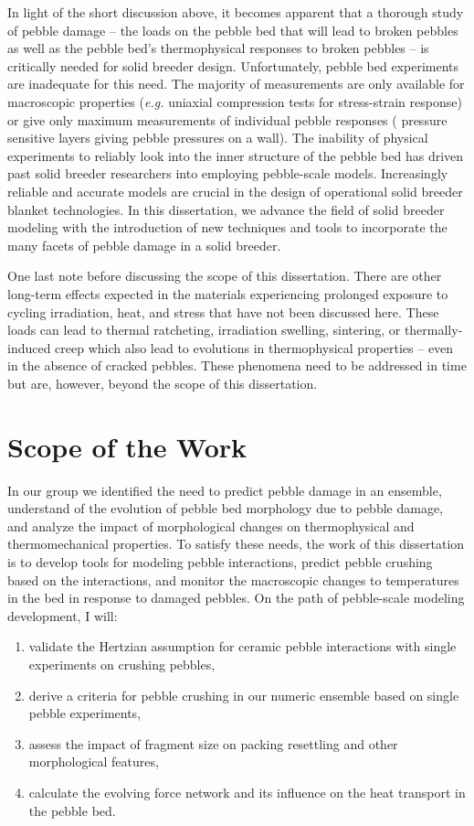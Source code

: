 In light of the short discussion above, it becomes apparent that a thorough study of pebble damage -- the loads on the pebble bed that will lead to broken pebbles as well as the pebble bed's thermophysical responses to broken pebbles -- is critically needed for solid breeder design. Unfortunately, pebble bed experiments are inadequate for this need. The majority of measurements are only available for macroscopic properties (\textit{e.g.} uniaxial compression tests for stress-strain response) or give only maximum measurements of individual pebble responses ( pressure sensitive layers giving pebble pressures on a wall). The inability of physical experiments to reliably look into the inner structure of the pebble bed has driven past solid breeder researchers into employing pebble-scale models. Increasingly reliable and accurate models are crucial in the design of operational solid breeder blanket technologies. In this dissertation, we advance the field of solid breeder modeling with the introduction of new techniques and tools to incorporate the many facets of pebble damage in a solid breeder.

One last note before discussing the scope of this dissertation. There are other long-term effects expected in the materials experiencing prolonged exposure to cycling irradiation, heat, and stress that have not been discussed here. These loads can lead to thermal ratcheting, irradiation swelling, sintering, or thermally-induced creep which also lead to evolutions in thermophysical properties -- even in the absence of cracked pebbles. These phenomena need to be addressed in time but are, however, beyond the scope of this dissertation. 

 

\section{Scope of the Work}\label{sec:intro-scope-of-work}

In our group we identified the need to predict pebble damage in an ensemble, understand of the evolution of pebble bed morphology due to pebble damage, and analyze the impact of morphological changes on thermophysical and thermomechanical properties. To satisfy these needs, the work of this dissertation is to develop tools for modeling pebble interactions, predict pebble crushing based on the interactions, and monitor the macroscopic changes to temperatures in the bed in response to damaged pebbles. On the path of pebble-scale modeling development, I will:
\begin{enumerate}
	\item validate the Hertzian assumption for ceramic pebble interactions with single experiments on crushing pebbles,
	\item derive a criteria for pebble crushing in our numeric ensemble based on single pebble experiments,
	\item assess the impact of fragment size on packing resettling and other morphological features,
	\item calculate the evolving force network and its influence on the heat transport in the pebble bed.
\end{enumerate}

